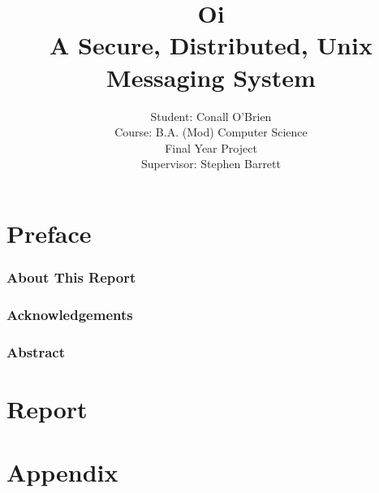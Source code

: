 \documentclass[a4paper,12pt]{report}
\begin{document}


\title{Oi \\ A Secure, Distributed, Unix Messaging System}

\author{Student: Conall O'Brien \\ 
		  Course:  B.A. (Mod) Computer Science \\
		  Final Year Project \\ 
		  Supervisor: Stephen Barrett} 


\date{}


\part*{Preface}


\section{About This Report}



\pagebreak


\section{Acknowledgements}



\pagebreak

\section{Abstract}



\begin{spacing}{0.8}

\tableofcontents

\listoftables

\listoffigures

\end{spacing}

\part*{Report}







\part*{Appendix}

\appendix



%



\end{document}
